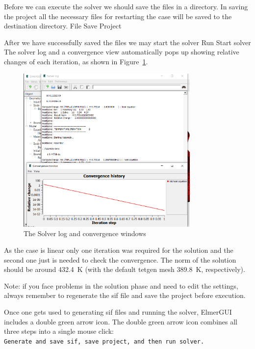 Before we can execute the solver we should save the files in a directory. In saving the project all the necessary files for restarting the case will be saved to the destination directory.
\ttbegin
File 
  Save Project
\ttend

After we have successfully saved the files we may start the solver
\ttbegin
Run
  Start solver
\ttend
The solver log and a convergence view automatically pops up showing relative changes of each iteration, as shown in Figure~\ref{fg:step-09}.  

\begin{figure}[H]
\begin{center}
\includegraphics[width=0.8\textwidth]{step-09}
\caption{The Solver log and convergence windows}\label{fg:step-09}
\end{center}
\end{figure}

As the case is linear only one iteration was required for the solution and the second one just is needed to check the convergence. The norm of the solution should be around 432.4~K (with the default tetgen mesh 389.8~K, respectively).

Note: if you face problems in the solution phase and need to edit the settings, always remember to regenerate the sif file and save the project before execution.

Once one gets used to generating sif files and running the solver, ElmerGUI includes a double green arrow icon.  The double green arrow icon combines all three steps into a single mouse click:\\
\texttt{Generate and save sif, save project, and then run solver.}

